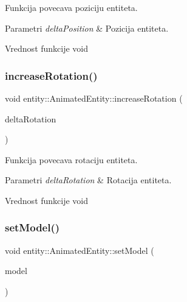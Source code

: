 Funkcija povecava poziciju entiteta. 


\begin{DoxyParams}{Parametri}
{\em delta\+Position} & Pozicija entiteta. \\
\hline
\end{DoxyParams}
\begin{DoxyReturn}{Vrednost funkcije}
void 
\end{DoxyReturn}
\mbox{\label{classentity_1_1AnimatedEntity_adc9ba713f406ad55f2c5f0baaf3d21b4}} 
\subsubsection{\texorpdfstring{increase\+Rotation()}{increaseRotation()}}
{\footnotesize\ttfamily void entity\+::\+Animated\+Entity\+::increase\+Rotation (\begin{DoxyParamCaption}\item[{vec3}]{delta\+Rotation }\end{DoxyParamCaption})}



Funkcija povecava rotaciju entiteta. 


\begin{DoxyParams}{Parametri}
{\em delta\+Rotation} & Rotacija entiteta. \\
\hline
\end{DoxyParams}
\begin{DoxyReturn}{Vrednost funkcije}
void 
\end{DoxyReturn}
\mbox{\label{classentity_1_1AnimatedEntity_ae4948cd74084f403db1e660e5815cad6}} 
\subsubsection{\texorpdfstring{set\+Model()}{setModel()}}
{\footnotesize\ttfamily void entity\+::\+Animated\+Entity\+::set\+Model (\begin{DoxyParamCaption}\item[{\hyperlink{classmodel_1_1AnimatedModel}{Animated\+Model} $\ast$}]{model }\end{DoxyParamCaption})}



